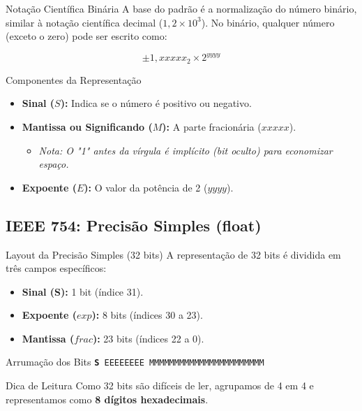 \begin{frame}{Notação Científica Binária}
    A base do padrão é a normalização do número binário, similar à notação científica decimal ($1,2 \times 10^3$). No binário, qualquer número (exceto o zero) pode ser escrito como:

    \[ \pm 1,xxxxx_2 \times 2^{yyyy} \]

    \begin{block}{Componentes da Representação}
        \begin{itemize}
            \item \textbf{Sinal ($S$):} Indica se o número é positivo ou negativo.
            \item \textbf{Mantissa ou Significando ($M$):} A parte fracionária ($xxxxx$).
                  \begin{itemize}
                      \item \textit{Nota: O "1" antes da vírgula é implícito (bit oculto) para economizar espaço.}
                  \end{itemize}
            \item \textbf{Expoente ($E$):} O valor da potência de 2 ($yyyy$).
        \end{itemize}
    \end{block}
\end{frame}

\subsection{IEEE 754: Precisão Simples (float)}

\begin{frame}{Layout da Precisão Simples (32 bits)}
    A representação de 32 bits é dividida em três campos específicos:

    \begin{itemize}
        \item \textbf{Sinal (S):} 1 bit (índice 31).
        \item \textbf{Expoente ($exp$):} 8 bits (índices 30 a 23).
        \item \textbf{Mantissa ($frac$):} 23 bits (índices 22 a 0).
    \end{itemize}

    \begin{block}{Arrumação dos Bits}
        \centering
        \texttt{\textbf{\color{red}S} \color{blue}EEEEEEEE \color{orange}MMMMMMMMMMMMMMMMMMMMMMM}
    \end{block}

    \begin{alertblock}{Dica de Leitura}
        Como 32 bits são difíceis de ler, agrupamos de 4 em 4 e representamos como \textbf{8 dígitos hexadecimais}.
    \end{alertblock}
\end{frame}

